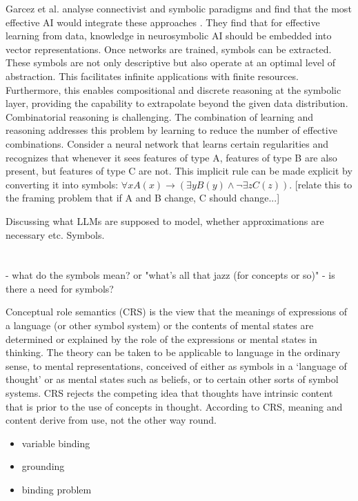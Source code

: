 Garcez et al. analyse connectivist and symbolic paradigms and find that the most effective AI would integrate these approaches \cite{garcez2020neurosymbolic}. They find that for effective learning from data, knowledge in neurosymbolic AI should be embedded into vector representations. Once networks are trained, symbols can be extracted. These symbols are not only descriptive but also operate at an optimal level of abstraction. This facilitates infinite applications with finite resources. Furthermore, this enables compositional and discrete reasoning at the symbolic layer, providing the capability to extrapolate beyond the given data distribution. Combinatorial reasoning is challenging. The combination of learning and reasoning addresses this problem by learning to reduce the number of effective combinations. 
Consider a neural network that learns certain regularities and recognizes that whenever it sees features of type A, features of type B are also present, but features of type C are not. This implicit rule can be made explicit by converting it into symbols: $\forall x A(x) \rightarrow (\exists y B(y) \land \lnot \exists z C(z))$.
[relate this to the framing problem that if A and B change, C should change...]


Discussing what LLMs are supposed to model, whether approximations are necessary etc. Symbols. \cite{Blank_2023}






\section{}
- what do the symbols mean? or "what's all that jazz (for concepts or so)"
- is there a need for symbols?

Conceptual role semantics (CRS) is the view that the meanings of expressions of a language (or other symbol system) or the contents of mental states are determined or explained by the role of the expressions or mental states in thinking. The theory can be taken to be applicable to language in the ordinary sense, to mental representations, conceived of either as symbols in a ‘language of thought’ or as mental states such as beliefs, or to certain other sorts of symbol systems. CRS rejects the competing idea that thoughts have intrinsic content that is prior to the use of concepts in thought. According to CRS, meaning and content derive from use, not the other way round.

\begin{itemize}
    \item variable binding
    \item grounding
    \item binding problem
\end{itemize}

